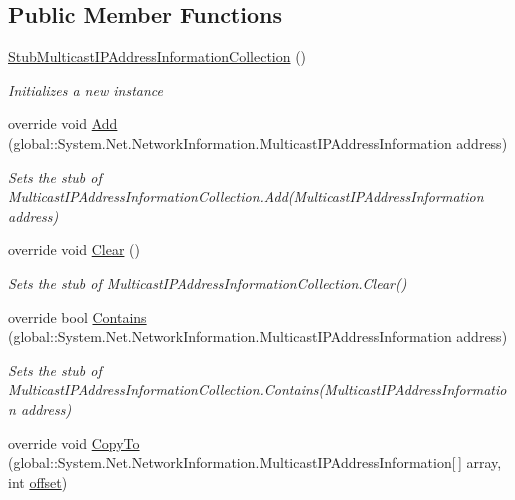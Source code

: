 \subsection*{Public Member Functions}
\begin{DoxyCompactItemize}
\item 
\hyperlink{class_system_1_1_net_1_1_network_information_1_1_fakes_1_1_stub_multicast_i_p_address_information_collection_a0239c092e1ad7b596979e703b87ac850}{Stub\-Multicast\-I\-P\-Address\-Information\-Collection} ()
\begin{DoxyCompactList}\small\item\em Initializes a new instance\end{DoxyCompactList}\item 
override void \hyperlink{class_system_1_1_net_1_1_network_information_1_1_fakes_1_1_stub_multicast_i_p_address_information_collection_ad55e08b2fcc5c6ab82675b1c4b4b8fd9}{Add} (global\-::\-System.\-Net.\-Network\-Information.\-Multicast\-I\-P\-Address\-Information address)
\begin{DoxyCompactList}\small\item\em Sets the stub of Multicast\-I\-P\-Address\-Information\-Collection.\-Add(\-Multicast\-I\-P\-Address\-Information address)\end{DoxyCompactList}\item 
override void \hyperlink{class_system_1_1_net_1_1_network_information_1_1_fakes_1_1_stub_multicast_i_p_address_information_collection_a13bf416481b465119d3a4e76818e75bc}{Clear} ()
\begin{DoxyCompactList}\small\item\em Sets the stub of Multicast\-I\-P\-Address\-Information\-Collection.\-Clear()\end{DoxyCompactList}\item 
override bool \hyperlink{class_system_1_1_net_1_1_network_information_1_1_fakes_1_1_stub_multicast_i_p_address_information_collection_a5dbe92ab1882224fff120f69fac20ffa}{Contains} (global\-::\-System.\-Net.\-Network\-Information.\-Multicast\-I\-P\-Address\-Information address)
\begin{DoxyCompactList}\small\item\em Sets the stub of Multicast\-I\-P\-Address\-Information\-Collection.\-Contains(\-Multicast\-I\-P\-Address\-Information address)\end{DoxyCompactList}\item 
override void \hyperlink{class_system_1_1_net_1_1_network_information_1_1_fakes_1_1_stub_multicast_i_p_address_information_collection_a1da01dbb11e0d9ba983c1c5b138a8cb2}{Copy\-To} (global\-::\-System.\-Net.\-Network\-Information.\-Multicast\-I\-P\-Address\-Information\mbox{[}$\,$\mbox{]} array, int \hyperlink{jquery-1_810_82_8js_a4a9f594d20d927164551fc7fa4751a2f}{offset})

\end{DoxyCompactItemize}
